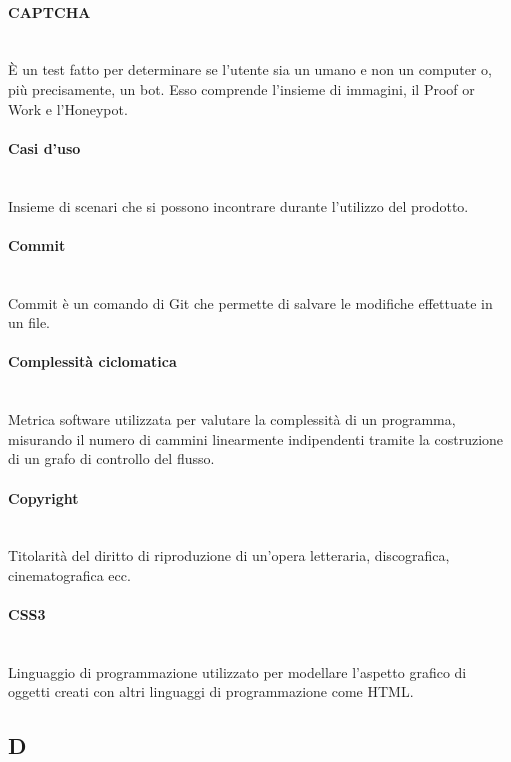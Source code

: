 \paragraph{CAPTCHA}~\smallskip \\
È un test fatto per determinare se l'utente sia un umano e non un computer o, più precisamente, un bot.
Esso comprende l'insieme di immagini, il Proof or Work e l'Honeypot.

\paragraph{Casi d'uso}~\smallskip \\
Insieme di scenari che si possono incontrare durante l'utilizzo del prodotto.

\paragraph{Commit}~\smallskip \\
Commit è un comando di Git che permette di salvare le modifiche effettuate in un file.

\paragraph{Complessità ciclomatica}~\smallskip \\
Metrica software utilizzata per valutare la complessità di un programma, misurando il numero di cammini linearmente indipendenti tramite la costruzione di un grafo di controllo del flusso.

\paragraph{Copyright}~\smallskip \\
Titolarità del diritto di riproduzione di un'opera letteraria, discografica, cinematografica ecc.

\paragraph{CSS3}~\smallskip \\
Linguaggio di programmazione utilizzato per modellare l'aspetto grafico di oggetti creati con altri linguaggi di programmazione come HTML.
\newpage
{}
\subsection*{D}
